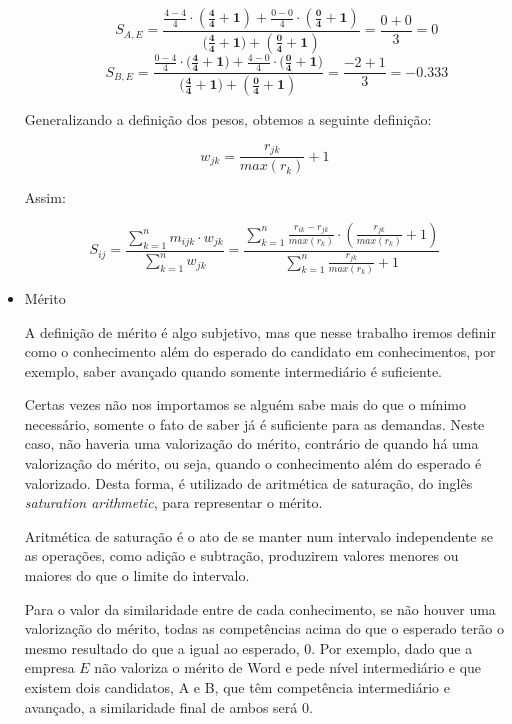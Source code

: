 \documentclass[preprint,12pt]{elsarticle}
\begin{document}
\begin{itemize}
\begin{itemize}
        $$ S_{A,E} = \frac{\tfrac{4 - 4}{4} \cdot \boldsymbol{(\tfrac{4}{4} + 1)} + \tfrac{0 - 0}{4} \cdot \boldsymbol{(\tfrac{0}{4} + 1)}}{(\boldsymbol{\tfrac{4}{4} + 1) + (\tfrac{0}{4} + 1)}} = \frac{0 + 0}{3} = 0 $$
        $$ S_{B,E} = \frac{\tfrac{0 - 4}{4} \cdot (\boldsymbol{\tfrac{4}{4} + 1)} + \tfrac{4 - 0}{4} \cdot (\boldsymbol{\tfrac{0}{4} + 1)}}{(\boldsymbol{\tfrac{4}{4} + 1) + (\tfrac{0}{4} + 1)}} = \frac{-2 + 1}{3} = -0.333 $$
        
    \end{itemize}
    
    Generalizando a definição dos pesos, obtemos a seguinte definição:
    
    \begin{equation}
        w_{jk} = \frac{r_{jk}}{max(r_k)} + 1
    \end{equation}
    
    Assim:
    
    \begin{equation}
    S_{ij} = \frac{\sum_{k=1}^n m_{ijk} \cdot w_{jk}}
                  {\sum_{k=1}^n w_{jk}} = 
             \frac{\sum_{k=1}^n \frac{r_{ik} - r_{jk}}{max(r_k)} \cdot (\frac{r_{jk}}{max(r_k)} + 1)}               {\sum_{k=1}^n {\frac{r_{jk}}{max(r_k)} + 1}}
    \end{equation}

    \item Mérito
    
    A definição de mérito é algo subjetivo, mas que nesse trabalho iremos definir como o conhecimento além do esperado do candidato em conhecimentos, por exemplo, saber avançado quando somente intermediário é suficiente. 
    
    Certas vezes não nos importamos se alguém sabe mais do que o mínimo necessário, somente o fato de saber já é suficiente para as demandas. Neste caso, não haveria uma valorização do mérito, contrário de quando há uma valorização do mérito, ou seja, quando o conhecimento além do esperado é valorizado. Desta forma, é utilizado de aritmética de saturação, do inglês \textit{saturation arithmetic}, para representar o mérito.
    
    Aritmética de saturação é o ato de se manter num intervalo independente se as operações, como adição e subtração, produzirem valores menores ou maiores do que o limite do intervalo.
    
    Para o valor da similaridade entre de cada conhecimento, se não houver uma valorização do mérito, todas as competências acima do que o esperado terão o mesmo resultado do que a igual ao esperado, 0. Por exemplo, dado que a empresa $E$ não valoriza o mérito de Word e pede nível intermediário e que existem dois candidatos, A e B, que têm competência intermediário e avançado, a similaridade final de ambos será 0.
    

\end{itemize}
\end{document}

